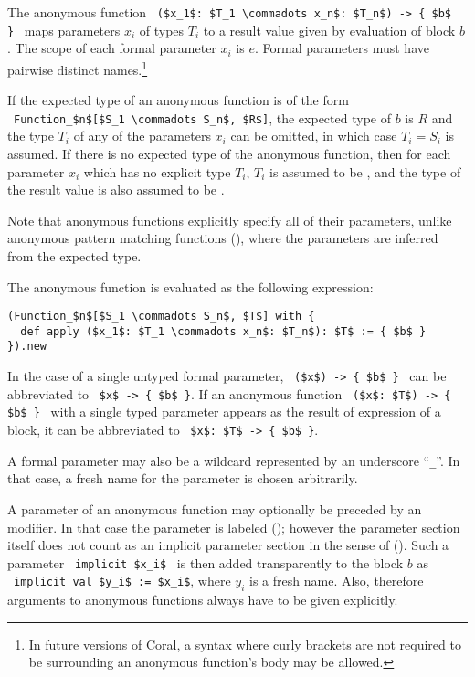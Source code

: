 The anonymous function ~\lstinline!($x_1$: $T_1 \commadots x_n$: $T_n$) -> { $b$ }!~ maps parameters $x_i$ of types $T_i$ to a result value given by evaluation of block $b$. The scope of each formal parameter $x_i$ is $e$. Formal parameters must have pairwise distinct names.\footnote{In future versions of Coral, a syntax where curly brackets are not required to be surrounding an anonymous function's body may be allowed.}

If the expected type of an anonymous function is of the form ~\lstinline!Function_$n$[$S_1 \commadots S_n$, $R$]!, the expected type of $b$ is $R$ and the type $T_i$ of any of the parameters $x_i$ can be omitted, in which case $T_i = S_i$ is assumed. If there is no expected type of the anonymous function, then for each parameter $x_i$ which has no explicit type $T_i$, $T_i$ is assumed to be , and the type of the result value is also assumed to be . 

Note that anonymous functions explicitly specify all of their parameters, unlike anonymous pattern matching functions (), where the parameters are inferred from the expected type. 

The anonymous function is evaluated as the following expression:
\begin{lstlisting}
(Function_$n$[$S_1 \commadots S_n$, $T$] with {
  def apply ($x_1$: $T_1 \commadots x_n$: $T_n$): $T$ := { $b$ }
}).new
\end{lstlisting}

In the case of a single untyped formal parameter, ~\lstinline!($x$) -> { $b$ }!~ can be abbreviated to ~\lstinline!$x$ -> { $b$ }!. If an anonymous function ~\lstinline!($x$: $T$) -> { $b$ }!~ with a single typed parameter appears as the result of expression of a block, it can be abbreviated to ~\lstinline!$x$: $T$ -> { $b$ }!.

A formal parameter may also be a wildcard represented by an underscore ``\lstinline!_!''. In that case, a fresh name for the parameter is chosen arbitrarily. 

A parameter of an anonymous function may optionally be preceded by an  modifier. In that case the parameter is labeled  (); however the parameter section itself does not count as an implicit parameter section in the sense of (). Such a parameter ~\lstinline!implicit $x_i$!~ is then added transparently to the block $b$ as ~\lstinline!implicit val $y_i$ := $x_i$!, where $y_i$ is a fresh name. Also, therefore arguments to anonymous functions always have to be given explicitly. 

